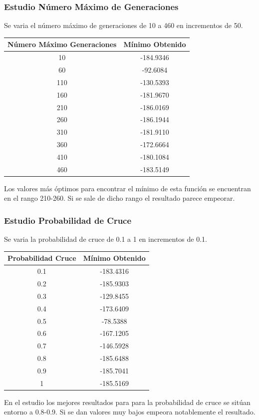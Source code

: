 \documentclass[12pt]{article}
\begin{document}
\subsubsection*{Estudio Número Máximo de Generaciones}
	Se varia el número máximo de generaciones de 10 a 460 en incrementos de 50.
\begin{table}[H]
\begin{center}
\begin{tabular}{|cc|} \hline
Número Máximo Generaciones & Mínimo Obtenido \\  \hline
10  & -184.9346 \\ 
60  & -92.6084 \\ 
110 & -130.5393 \\
160 & -181.9670 \\
210 & -186.0169 \\
260 & -186.1944 \\
310 & -181.9110 \\
360 & -172.6664 \\ 
410 & -180.1084 \\
460 & -183.5149 \\  \hline
\end{tabular}
\end{center}
\end{table}
	Los valores más óptimos para encontrar el mínimo de esta función se encuentran en el rango 210-260. Si se sale de dicho rango el resultado parece empeorar.

\subsubsection*{Estudio Probabilidad de Cruce}
	Se varia la probabilidad de cruce de 0.1 a 1 en incrementos de 0.1.
\begin{table}[H]
\begin{center}
\begin{tabular}{|cc|} \hline
Probabilidad Cruce & Mínimo Obtenido \\  \hline
0.1 & -183.4316 \\ 
0.2 & -185.9303 \\ 
0.3 & -129.8455 \\
0.4 & -173.6409 \\
0.5 & -78.5388 \\
0.6 & -167.1205 \\
0.7 & -146.5928 \\
0.8 & -185.6488 \\ 
0.9 & -185.7041 \\
1   & -185.5169 \\  \hline
\end{tabular}
\end{center} 
\end{table}
	En el estudio los mejores resultados para para la probabilidad de cruce se sitúan entorno a 0.8-0.9. Si se dan valores muy bajos empeora notablemente el resultado.
\end{document}
